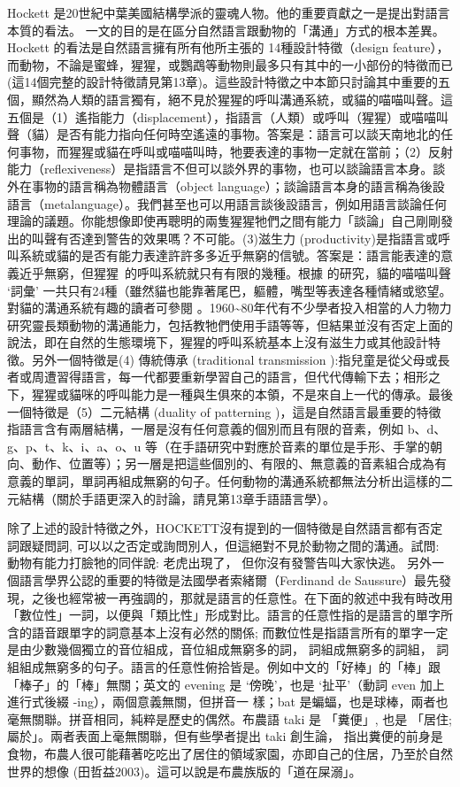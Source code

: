 Hockett 是20世紀中葉美國結構學派的靈魂人物。他的重要貢獻之一是提出對語言本質的看法。\citet{Hockett1960} 一文的目的是在區分自然語言跟動物的「溝通」方式的根本差異。Hockett 的看法是自然語言擁有所有他所主張的 14種設計特徵（design feature），而動物，不論是蜜蜂，猩猩，或鸚鵡等動物則最多只有其中的一小部份的特徵而已 (這14個完整的設計特徵請見第13章)。這些設計特徵之中本節只討論其中重要的五個，顯然為人類的語言獨有，絕不見於猩猩的呼叫溝通系統，或貓的喵喵叫聲。這五個是（1）遙指能力（displacement），指語言（人類）或呼叫（猩猩）或喵喵叫聲（貓）是否有能力指向任何時空遙遠的事物。答案是：語言可以談天南地北的任何事物，而猩猩或貓在呼叫或喵喵叫時，牠要表達的事物一定就在當前；（2）反射能力（reflexiveness）是指語言不但可以談外界的事物，也可以談論語言本身。談外在事物的語言稱為物體語言（object language）；談論語言本身的語言稱為後設語言（metalanguage）。我們甚至也可以用語言談後設語言，例如用語言談論任何理論的議題。你能想像即使再聰明的兩隻猩猩牠們之間有能力「談論」自己剛剛發出的叫聲有否達到警告的效果嗎？不可能。(3)滋生力 (productivity)是指語言或呼叫系統或貓的是否有能力表達許許多多近乎無窮的信號。答案是：語言能表達的意義近乎無窮，但猩猩~的呼叫系統就只有有限的幾種。根據\citet{NewmanWeitzman2015} 的研究，貓的喵喵叫聲 ‘詞彙’ 一共只有24種（雖然貓也能靠著尾巴，軀體，嘴型等表達各種情緒或慾望。 對貓的溝通系統有趣的讀者可參閱 \citet{Schötz2018}。1960{\textasciitilde}80年代有不少學者投入相當的人力物力研究靈長類動物的溝通能力，包括教牠們使用手語等等，但結果並沒有否定上面的說法，即在自然的生態環境下，猩猩的呼叫系統基本上沒有滋生力或其他設計特徵。另外一個特徵是(4) 傳統傳承 (traditional transmission ):指兒童是從父母或長者或周遭習得語言，每一代都要重新學習自己的語言，但代代傳輸下去；相形之下，猩猩或貓咪的呼叫能力是一種與生俱來的本領，不是來自上一代的傳承。最後一個特徵是（5）二元結構 (duality of patterning )，這是自然語言最重要的特徵指語言含有兩層結構，一層是沒有任何意義的個別而且有限的音素，例如 b、d、g、p、t、k、i、a、o、u 等（在手語研究中對應於音素的單位是手形、手掌的朝向、動作、位置等）；另一層是把這些個別的、有限的、無意義的音素組合成為有意義的單詞，單詞再組成無窮的句子。任何動物的溝通系統都無法分析出這樣的二元結構（關於手語更深入的討論，請見第13章手語語言學）。

除了上述的設計特徵之外，HOCKETT沒有提到的一個特徵是自然語言都有否定詞跟疑問詞, 可以以之否定或詢問別人，但這絕對不見於動物之間的溝通。試問: 動物有能力打臉牠的同伴說: 老虎出現了， 但你沒有發警告叫大家快逃。 另外一個語言學界公認的重要的特徵是法國學者索緒爾（Ferdinand de Saussure）最先發現，之後也經常被一再強調的，那就是語言的任意性。在下面的敘述中我有時改用「數位性」一詞，以便與「類比性」形成對比。語言的任意性指的是語言的單字所含的語音跟單字的詞意基本上沒有必然的關係; 而數位性是指語言所有的單字一定是由少數幾個獨立的音位組成，音位組成無窮多的詞， 詞組成無窮多的詞組， 詞組組成無窮多的句子。語言的任意性俯拾皆是。例如中文的「好棒」的「棒」跟「棒子」的「棒」無關；英文的 evening 是 ‘傍晚’，也是 ‘扯平’（動詞 even 加上進行式後綴 -ing），兩個意義無關，但拼音一 樣；bat 是蝙蝠，也是球棒，兩者也毫無關聯。拼音相同，純粹是歷史的偶然。布農語 taki 是 「糞便」, 也是 「居住;屬於」。兩者表面上毫無關聯，但有些學者提出 taki 創生論， 指出糞便的前身是食物，布農人很可能藉著吃吃出了居住的領域家園，亦即自己的住居，乃至於自然世界的想像 (田哲益2003)。這可以說是布農族版的「道在屎溺」。

